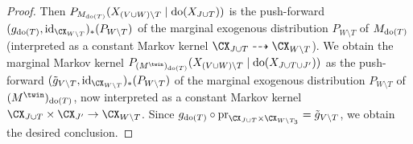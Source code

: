\begin{proof}
  Then $P_{M_{\operatorname{do}(T)}}(X_{(V \cup W)\setminus T} \mid \operatorname{do}(X_{J\cup T}))$ is 
  the push-forward $(g_{\doit(T)},\id_{\CX_{W\setminus T}})_*(P_{W\setminus T})$ of the marginal exogenous distribution 
  $P_{W\setminus T}$ of $M_{\operatorname{do}(T)}$ (interpreted as a constant Markov kernel $\CX_{J \cup T} \dshto \CX_{W \setminus T}$).
  We obtain the marginal Markov kernel $P_{(M^\twin)_{\doit(T)}}(X_{(V \cup W) \setminus T} \mid \doit(X_{J\cup T\cup J'}))$ as the push-forward 
  $(\tilde{g}_{V\setminus T},\id_{\CX_{W\setminus T}})_*(P_{W\setminus T})$ of the marginal exogenous distribution $P_{W\setminus T}$ of $(M^\twin)_{\doit(T)}$, now interpreted as a constant
  Markov kernel $\CX_{J\cup T} \times \CX_{J'} \to \CX_{W\setminus T}$. 
  Since $g_{\doit(T)} \circ \pr_{\CX_{J\cup T} \times \CX_{W\setminus T_3}} = \tilde{g}_{V\setminus T}$,
  we obtain the desired conclusion.
\end{proof}

